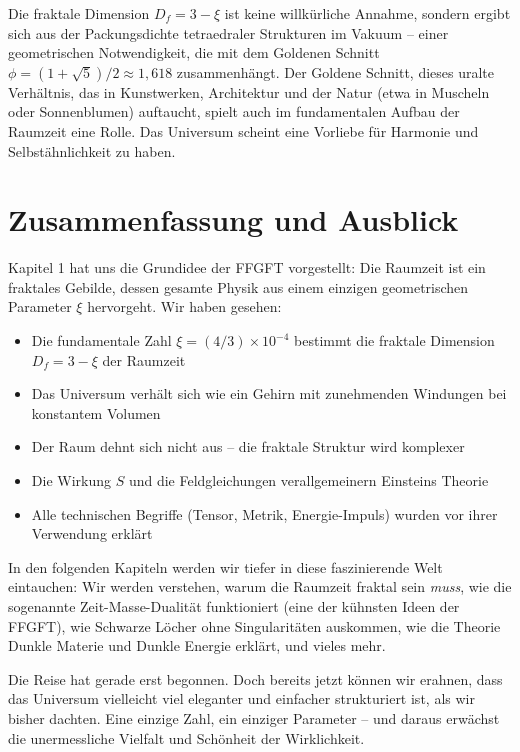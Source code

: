 Die fraktale Dimension $D_f = 3 - \xi$ ist keine willkürliche Annahme, sondern ergibt sich aus der Packungsdichte tetraedraler Strukturen im Vakuum – einer geometrischen Notwendigkeit, die mit dem Goldenen Schnitt $\phi = (1 + \sqrt{5})/2 \approx 1,618$ zusammenhängt. Der Goldene Schnitt, dieses uralte Verhältnis, das in Kunstwerken, Architektur und der Natur (etwa in Muscheln oder Sonnenblumen) auftaucht, spielt auch im fundamentalen Aufbau der Raumzeit eine Rolle. Das Universum scheint eine Vorliebe für Harmonie und Selbstähnlichkeit zu haben.

\section{Zusammenfassung und Ausblick}

Kapitel 1 hat uns die Grundidee der FFGFT vorgestellt: Die Raumzeit ist ein fraktales Gebilde, dessen gesamte Physik aus einem einzigen geometrischen Parameter $\xi$ hervorgeht. Wir haben gesehen:

\begin{itemize}[leftmargin=*]
\item Die fundamentale Zahl $\xi = (4/3) \times 10^{-4}$ bestimmt die fraktale Dimension $D_f = 3 - \xi$ der Raumzeit
\item Das Universum verhält sich wie ein Gehirn mit zunehmenden Windungen bei konstantem Volumen
\item Der Raum dehnt sich nicht aus – die fraktale Struktur wird komplexer
\item Die Wirkung $S$ und die Feldgleichungen verallgemeinern Einsteins Theorie
\item Alle technischen Begriffe (Tensor, Metrik, Energie-Impuls) wurden vor ihrer Verwendung erklärt
\end{itemize}

In den folgenden Kapiteln werden wir tiefer in diese faszinierende Welt eintauchen: Wir werden verstehen, warum die Raumzeit fraktal sein \textit{muss}, wie die sogenannte Zeit-Masse-Dualität funktioniert (eine der kühnsten Ideen der FFGFT), wie Schwarze Löcher ohne Singularitäten auskommen, wie die Theorie Dunkle Materie und Dunkle Energie erklärt, und vieles mehr.

Die Reise hat gerade erst begonnen. Doch bereits jetzt können wir erahnen, dass das Universum vielleicht viel eleganter und einfacher strukturiert ist, als wir bisher dachten. Eine einzige Zahl, ein einziger Parameter – und daraus erwächst die unermessliche Vielfalt und Schönheit der Wirklichkeit.


